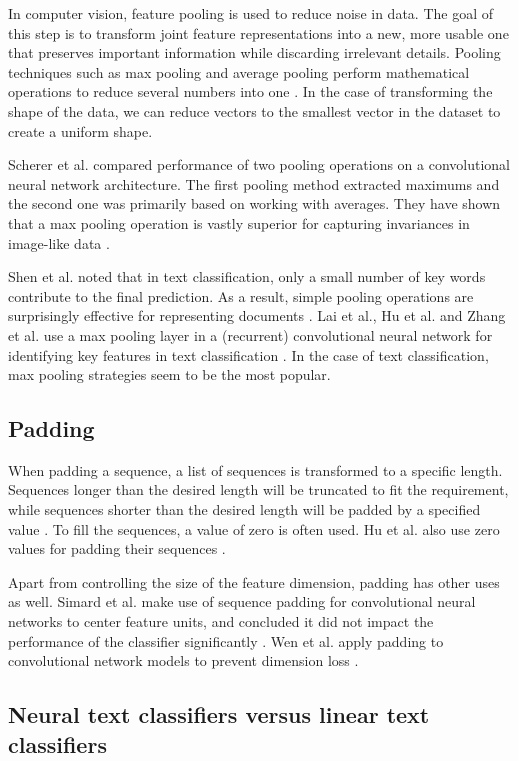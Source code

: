 In computer vision, feature pooling is used to reduce noise in data. 
The goal of this step is to transform joint feature representations into a new, more usable one that preserves important information while discarding irrelevant details. 
Pooling techniques such as max pooling and average pooling perform mathematical operations to reduce several numbers into one \cite{boureau2010}. 
In the case of transforming the shape of the data, we can reduce vectors to the smallest vector in the dataset to create a uniform shape.

Scherer et al. compared performance of two pooling operations on a convolutional neural network architecture. 
The first pooling method extracted maximums and the second one was primarily based on working with averages.
They have shown that a max pooling operation is vastly superior for capturing invariances in image-like data \cite{scherer2010}.

Shen et al. noted that in text classification, only a small number of key words contribute to the final prediction.
As a result, simple pooling operations are surprisingly effective for representing documents \cite{shen2018}.  
Lai et al., Hu et al. and Zhang et al. use a max pooling layer in a (recurrent) convolutional neural network for identifying key features in text classification \cite{lai2015}\cite{hu2014}\cite{zhang2015}. 
In the case of text classification, max pooling strategies seem to be the most popular. 

\subsection{Padding}
When padding a sequence, a list of sequences is transformed to a specific length. 
Sequences longer than the desired length will be truncated to fit the requirement, while sequences shorter than the desired length will be padded by a specified value \cite{keraspad}. 
To fill the sequences, a value of zero is often used. Hu et al. also use zero values for padding their sequences \cite{hu2014}. 

Apart from controlling the size of the feature dimension, padding has other uses as well. 
Simard et al. make use of sequence padding for convolutional neural networks to center feature units, and concluded it did not impact the performance of the classifier significantly \cite{simard2003}. 
Wen et al. apply padding to convolutional network models to prevent dimension loss \cite{wen2018}. 

\subsection{Neural text classifiers versus linear text classifiers}
